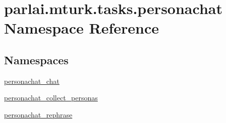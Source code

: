 \hypertarget{namespaceparlai_1_1mturk_1_1tasks_1_1personachat}{}\section{parlai.\+mturk.\+tasks.\+personachat Namespace Reference}
\label{namespaceparlai_1_1mturk_1_1tasks_1_1personachat}
\subsection*{Namespaces}
\begin{DoxyCompactItemize}
\item 
 \hyperlink{namespaceparlai_1_1mturk_1_1tasks_1_1personachat_1_1personachat__chat}{personachat\+\_\+chat}
\item 
 \hyperlink{namespaceparlai_1_1mturk_1_1tasks_1_1personachat_1_1personachat__collect__personas}{personachat\+\_\+collect\+\_\+personas}
\item 
 \hyperlink{namespaceparlai_1_1mturk_1_1tasks_1_1personachat_1_1personachat__rephrase}{personachat\+\_\+rephrase}
\end{DoxyCompactItemize}
